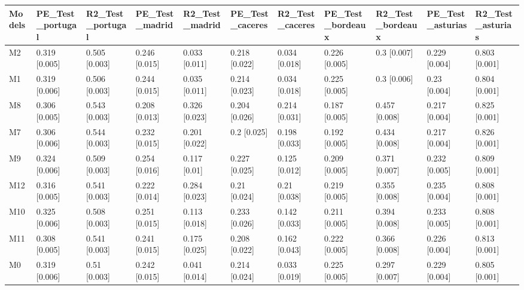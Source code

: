 \begin{table}[ht]
\centering
\begin{tabular}{lllllllllll}
  \hline
Models & PE\_Test\_portugal & R2\_Test\_portugal & PE\_Test\_madrid & R2\_Test\_madrid & PE\_Test\_caceres & R2\_Test\_caceres & PE\_Test\_bordeaux & R2\_Test\_bordeaux & PE\_Test\_asturias & R2\_Test\_asturias \\ 
  \hline
M2 & 0.319 [0.005] & 0.505 [0.003] & 0.246 [0.015] & 0.033 [0.011] & 0.218 [0.022] & 0.034 [0.018] & 0.226 [0.005] & 0.3 [0.007] & 0.229 [0.004] & 0.803 [0.001] \\ 
  M1 & 0.319 [0.006] & 0.506 [0.003] & 0.244 [0.015] & 0.035 [0.011] & 0.214 [0.023] & 0.034 [0.018] & 0.225 [0.005] & 0.3 [0.006] & 0.23 [0.004] & 0.804 [0.001] \\ 
  M8 & 0.306 [0.005] & 0.543 [0.003] & 0.208 [0.013] & 0.326 [0.023] & 0.204 [0.026] & 0.214 [0.031] & 0.187 [0.005] & 0.457 [0.008] & 0.217 [0.004] & 0.825 [0.001] \\ 
  M7 & 0.306 [0.006] & 0.544 [0.003] & 0.232 [0.015] & 0.201 [0.022] & 0.2 [0.025] & 0.198 [0.033] & 0.192 [0.005] & 0.434 [0.008] & 0.217 [0.004] & 0.826 [0.001] \\ 
  M9 & 0.324 [0.006] & 0.509 [0.003] & 0.254 [0.016] & 0.117 [0.01] & 0.227 [0.025] & 0.125 [0.012] & 0.209 [0.005] & 0.371 [0.007] & 0.232 [0.005] & 0.809 [0.001] \\ 
  M12 & 0.316 [0.005] & 0.541 [0.003] & 0.222 [0.014] & 0.284 [0.023] & 0.21 [0.024] & 0.21 [0.038] & 0.219 [0.005] & 0.355 [0.008] & 0.235 [0.004] & 0.808 [0.001] \\ 
  M10 & 0.325 [0.006] & 0.508 [0.003] & 0.251 [0.015] & 0.113 [0.018] & 0.233 [0.026] & 0.142 [0.033] & 0.211 [0.005] & 0.394 [0.008] & 0.233 [0.005] & 0.808 [0.001] \\ 
  M11 & 0.308 [0.005] & 0.541 [0.003] & 0.241 [0.015] & 0.175 [0.025] & 0.208 [0.022] & 0.162 [0.043] & 0.222 [0.005] & 0.366 [0.008] & 0.226 [0.004] & 0.813 [0.001] \\ 
  M0 & 0.319 [0.006] & 0.51 [0.003] & 0.242 [0.015] & 0.041 [0.014] & 0.214 [0.024] & 0.033 [0.019] & 0.225 [0.005] & 0.297 [0.007] & 0.229 [0.004] & 0.805 [0.001] \\ 
   \hline
\end{tabular}
\end{table}
